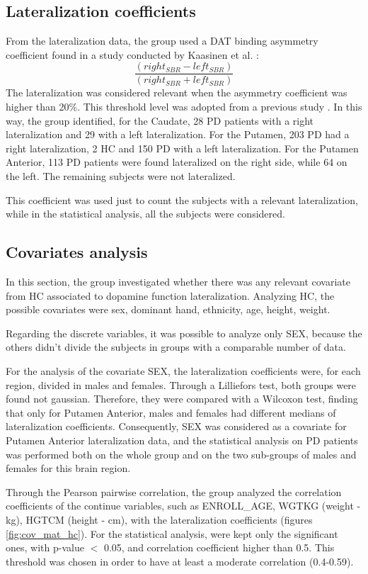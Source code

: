 \documentclass[]{article}
\begin{document}
\begin{multicols}{2}
\subsection{Lateralization coefficients}

From the lateralization data, the group used a DAT binding asymmetry coefficient found in a study conducted by Kaasinen et al. \cite{kaasinen_ipsilateral_2016}: 
\begin{equation}
	\frac{(right_{SBR} - left_{SBR})}{(right_{SBR} + left_{SBR})}
\end{equation}
The lateralization was considered relevant when the asymmetry coefficient was higher than 20\%.
This threshold level was adopted from a previous study \cite{fiorenzato_asymmetric_2021}. In this way, the group identified, for the Caudate, 28 PD patients with a right lateralization and 29 with a left lateralization. For the Putamen, 203 PD had a right lateralization, 2 HC and 150 PD with a left lateralization. For the Putamen Anterior, 113 PD patients were found lateralized on the right side, while 64 on the left. The remaining subjects were not lateralized.

This coefficient was used just to count the subjects with a relevant lateralization, while in the statistical analysis, all the subjects were considered.

\subsection{Covariates analysis}

In this section, the group investigated whether there was any relevant covariate from HC associated to dopamine function lateralization.
Analyzing HC, the possible covariates were sex, dominant hand, ethnicity, age, height, weight.

Regarding the discrete variables, it was possible to analyze only SEX, because the others didn't divide the subjects in groups with a comparable number of data.

For the analysis of the covariate SEX, the lateralization coefficients were, for each region, divided in males and females. Through a Lilliefors test, both groups were found not gaussian. Therefore, they were compared with a Wilcoxon test, finding that only for Putamen Anterior, males and females had different medians of lateralization coefficients.
Consequently, SEX was considered as a covariate for Putamen Anterior lateralization data, and the statistical analysis on PD patients was performed both on the whole group and on the two sub-groups of males and females for this brain region.

Through the Pearson pairwise correlation, the group analyzed the correlation coefficients of the continue variables, such as ENROLL\_AGE, WGTKG (weight - kg), HGTCM (height - cm), with the lateralization coefficients (figures \ref{fig:cov_mat_hc}). For the statistical analysis, were kept only the significant ones, with p-value $<$ 0.05, and correlation coefficient higher than 0.5. This threshold was chosen in order to have at least a moderate correlation (0.4-0.59). 

\end{multicols}
\end{document}
